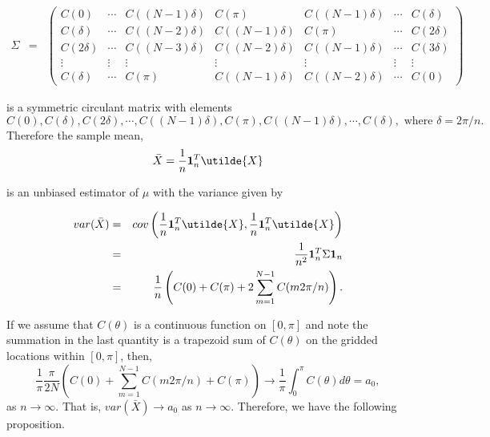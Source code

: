 \begin{eqnarray*}
	\Sigma &=& \left(\begin{array}{ccccccc}
	C(0)      & \cdots & C((N-1)\delta ) & C(\pi) &  C((N-1)\delta ) & \cdots & C(\delta) \\
	C(\delta) & \cdots & C((N-2)\delta) & C((N-1)\delta) &  C(\pi)  & \cdots & C(2\delta) \\
	C(2\delta) & \cdots & C((N-3)\delta) & C((N-2)\delta) &  C((N-1)\delta) & \cdots & C(3\delta)\\
	\vdots    & \vdots  & \vdots  & \vdots  & \vdots  & \vdots  & \vdots  \\
	C(\delta) & \cdots & C(\pi) &  C((N-1)\delta) & C((N-2)\delta)  & \cdots & C(0)
	\end{array} \right)
\end{eqnarray*}

\noi is a symmetric circulant matrix with elements
\[
C(0),C(\delta), C(2\delta), \cdots, C((N-1)\delta), C(\pi),  C((N-1)\delta), \cdots, C(\delta), \mbox{ where } \delta = 2\pi/n.
\]
Therefore the sample mean, 
\[
\bar{X} = \frac{1}{n}{\bf 1}_n^T \utilde{X}
\]

\noi is an unbiased estimator of $\mu$ with the variance given by

\begin{eqnarray*}
var(\bar{X}) &=& cov\left(\frac{1}{n}{\bf 1}_n^T \utilde{X}, \frac{1}{n}{\bf 1}_n^T \utilde{X}\right) \nonumber \\
	&=& \frac{1}{n^2}{\bf 1}_n^T \Sigma {\bf 1}_n \nonumber \\
	&=& \frac{1}{n} \left(C(0)+C(\pi)+2 \sum_{m=1}^{N-1}C(m 2\pi/n)\right). \nonumber
\end{eqnarray*}

If we assume that $C(\theta)$ is a continuous function on $[0, \pi]$ and note the summation in the last quantity is a trapezoid sum of $C(\theta)$ on the gridded locations within $[0, \pi]$, then,
\[
\frac{1}{\pi} \frac{\pi}{2 N} \left(C(0) + \sum_{m=1}^{N-1}C(m 2\pi/n) + C(\pi) \right) \to \frac{1}{\pi} \int_0^\pi C(\theta)d\theta = a_0,
\]
as $n \to \infty$. That is, $var(\bar{X}) \to a_0$ as $n \to \infty$. Therefore, we have the following proposition. \\



